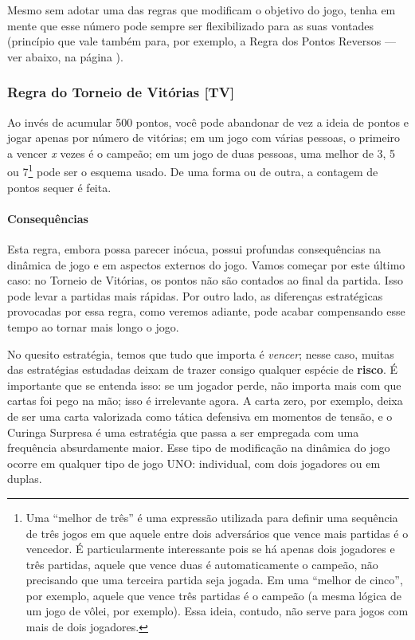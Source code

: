 Mesmo sem adotar uma das regras que modificam o objetivo do jogo, tenha em mente que esse número pode sempre ser flexibilizado para as suas vontades (princípio que vale também para, por exemplo, a Regra dos Pontos Reversos --- ver abaixo, na página \pageref{pontosreversos}). 

\subsubsection{Regra do Torneio de Vitórias [TV]}

Ao invés de acumular 500 pontos, você pode abandonar de vez a ideia de pontos e jogar apenas por número de vitórias; em um jogo com várias pessoas, o primeiro a vencer \textit{x} vezes é o campeão; em um jogo de duas pessoas, uma melhor de 3, 5 ou 7\footnote{Uma ``melhor de três'' é uma expressão utilizada para definir uma sequência de três jogos em que aquele entre dois adversários que vence mais partidas é o vencedor. É particularmente interessante pois se há apenas dois jogadores e três partidas, aquele que vence duas é automaticamente o campeão, não precisando que uma terceira partida seja jogada. Em uma ``melhor de cinco'', por exemplo, aquele que vence três partidas é o campeão (a mesma lógica de um jogo de vôlei, por exemplo). Essa ideia, contudo, não serve para jogos com mais de dois jogadores.} pode ser o esquema usado. De uma forma ou de outra, a contagem de pontos sequer é feita.

\paragraph{Consequências}

Esta regra, embora possa parecer inócua, possui profundas consequências na dinâmica de jogo e em aspectos externos do jogo. Vamos começar por este último caso: no Torneio de Vitórias, os pontos não são contados ao final da partida. Isso pode levar a partidas mais rápidas. Por outro lado, as diferenças estratégicas provocadas por essa regra, como veremos adiante, pode acabar compensando esse tempo ao tornar mais longo o jogo.

No quesito estratégia, temos que tudo que importa é \textit{vencer}; nesse caso, muitas das estratégias estudadas deixam de trazer consigo qualquer espécie de \textbf{risco}. É importante que se entenda isso: se um jogador perde, não importa mais com que cartas foi pego na mão; isso é irrelevante agora. A carta zero, por exemplo, deixa de ser uma carta valorizada como tática defensiva em momentos de tensão, e o Curinga Surpresa é uma estratégia que passa a ser empregada com uma frequência absurdamente maior. Esse tipo de modificação na dinâmica do jogo ocorre em qualquer tipo de jogo UNO: individual, com dois jogadores ou em duplas.

